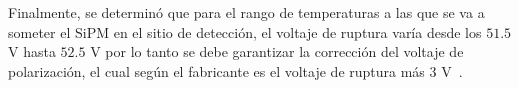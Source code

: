 \documentclass[runningheads]{llncs}
\begin{document}
Finalmente, se determinó que para el rango de temperaturas a las que se va a someter el SiPM en el sitio de detección, el voltaje de ruptura varía desde los $51.5 $ V hasta $52.5$ V por lo tanto se debe garantizar la corrección del voltaje de polarización, el cual según el fabricante es el voltaje de ruptura más $3$ V~\cite{Sipm_S13360_1350CS_datasheet}.   %

%

%

\end{document}
